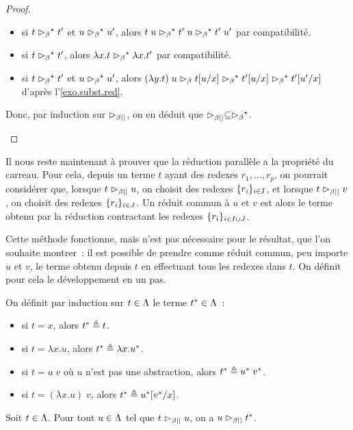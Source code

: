 \begin{proof}
\begin{itemize}
\begin{itemize}
    \item si $t\mathrel{\rhd_{\beta}}^{\mathord{\star}} t'$ et $u\mathrel{\rhd_{\beta}}^{\mathord{\star}} u'$, alors
      $t\;u\mathrel{\rhd_{\beta}}^{\mathord{\star}} t'\;u\mathrel{\rhd_{\beta}}^{\mathord{\star}} t'\;u'$ par compatibilité.
    \item si $t\mathrel{\rhd_{\beta}}^{\mathord{\star}} t'$, alors
      $\lambda x.t\mathrel{\rhd_{\beta}}^{\mathord{\star}} \lambda x.t'$ par compatibilité.
    \item si $t\mathrel{\rhd_{\beta}}^{\mathord{\star}} t'$ et $u\mathrel{\rhd_{\beta}}^{\mathord{\star}} u'$, alors
      $(\lambda y.t)\;u \mathrel{\rhd_{\beta}} t[u/x] \mathrel{\rhd_{\beta}}^{\mathord{\star}}
      t'[u/x]\mathrel{\rhd_{\beta}}^{\mathord{\star}} t'[u'/x]$
      d'après l'\cref{exo.subst.red}.
    \end{itemize}
    Donc, par induction sur $\mathrel{\rhd_{\mathord{\beta}\mathord{||}}}$, on en déduit que
    $\mathrel{\rhd_{\mathord{\beta}\mathord{||}}}\subseteq\mathrel{\rhd_{\beta}}^\star$.\qedhere
  \end{itemize}
\end{proof}

Il nous reste maintenant à prouver que la réduction parallèle a la propriété du
carreau. Pour cela, depuis un terme $t$ ayant des redexes $r_1,\ldots,r_p$,
on pourrait considérer que, lorsque $t \mathrel{\rhd_{\mathord{\beta}\mathord{||}}} u$, on choisit des redexes
$\{r_i\}_{i \in I}$, et lorsque $t \mathrel{\rhd_{\mathord{\beta}\mathord{||}}} v$, on choisit des redexes
$\{r_i\}_{i \in J}$. Un réduit commun à $u$ et $v$ est alors le terme obtenu
par la réduction contractant les redexes $\{r_i\}_{i \in I \cup J}$.

Cette méthode fonctionne, mais n'est pas nécessaire pour le résultat, que l'on
souhaite montrer~: il est possible de prendre comme réduit commun, peu importe
$u$ et $v$, le terme obtenu depuis $t$ en effectuant tous les redexes dans $t$.
On définit pour cela le développement en un pas.

\begin{definition}
  On définit par induction sur $t\in \Lambda$ le terme $t^* \in \Lambda$~:
  \begin{itemize}
  \item si $t = x$, alors $t^* \triangleq t$.
  \item si $t = \lambda x.u$, alors $t^* \triangleq \lambda x. u^*$.
  \item si $t = u\;v$ où $u$ n'est pas une abstraction, alors
    $t^* \triangleq u^*\;v^*$.
  \item si $t = (\lambda x.u)\;v$, alors $t^* \triangleq u^*[v^*/x]$.
  \end{itemize}
\end{definition}

\begin{proposition}
  Soit $t \in \Lambda$. Pour tout $u \in \Lambda$ tel que $t\mathrel{\rhd_{\mathord{\beta}\mathord{||}}} u$, on a
  $u\mathrel{\rhd_{\mathord{\beta}\mathord{||}}} t^*$.
\end{proposition}

